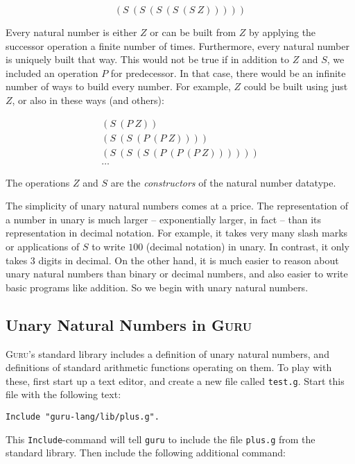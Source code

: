 \documentclass{book}[12pt]
\newcommand{\guru}[0]{\textsc{Guru}}
\begin{document}
\[ (S\ (S\ (S\ (S\ (S\ Z))))) \]

Every natural number is either $Z$ or can be built from $Z$ by
applying the successor operation a finite number of times.
Furthermore, every natural number is uniquely built that way.  This
would not be true if in addition to $Z$ and $S$, we included an
operation $P$ for predecessor.  In that case, there would be an
infinite number of ways to build every number.  For example, $Z$ could
be built using just $Z$, or also in these ways (and others):

\[ 
\begin{array}{l}
(S\ (P\ Z)) \\
(S\ (S\ (P\ (P\ Z)))) \\
(S\ (S\ (S\ (P\ (P\ (P\ Z)))))) \\
\ldots
\end{array}
\]

\noindent The operations $Z$ and $S$ are the \emph{constructors} of
the natural number datatype.

The simplicity of unary natural numbers comes at a price.  The
representation of a number in unary is much larger -- exponentially
larger, in fact -- than its representation in decimal notation.  For
example, it takes very many slash marks or applications of $S$ to
write $100$ (decimal notation) in unary.  In contrast, it only takes 3
digits in decimal.  On the other hand, it is much easier to reason
about unary natural numbers than binary or decimal numbers, and also
easier to write basic programs like addition.  So we begin with unary
natural numbers.

\subsection{Unary Natural Numbers in \guru}
\label{sec:natguru}

\guru's standard library includes a definition of unary natural
numbers, and definitions of standard arithmetic functions operating on
them.  To play with these, first start up a text editor, and create a
new file called \texttt{test.g}.  Start this file with the following
text:

\begin{verbatim}
Include "guru-lang/lib/plus.g".
\end{verbatim}

\noindent This \texttt{Include}-command will tell \texttt{guru} to
include the file \texttt{plus.g} from the standard library.  Then
include the following additional command:
\end{document}

